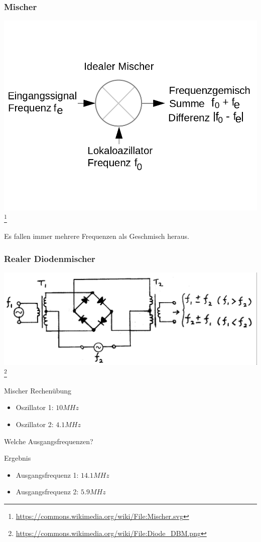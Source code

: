 \begin{frame}
    \frametitle{Mischer}
    \begin{center}
        \includegraphics[width=.8\textwidth,height=.75\textheight,keepaspectratio]{e15/IdealerMischer.png}
        \footnote{\tiny \url{https://commons.wikimedia.org/wiki/File:Mischer.svg}}
	\end{center}
    Es fallen immer mehrere Frequenzen als Geschmisch heraus.
\end{frame}

\begin{frame}
    \frametitle{Realer Diodenmischer}
    \begin{center}
        \includegraphics[width=.9\textwidth]{e15/Realer-Diodenmischer.png}
        \footnote{\tiny \url{https://commons.wikimedia.org/wiki/File:Diode_DBM.png}}
	\end{center}
\end{frame}

\begin{frame}
  \begin{exampleblock}{Mischer Rechenübung}
    \begin{itemize}
      \item Oszillator 1: $10 MHz$
      \item Oszillator 2: $4.1 MHz$
    \end{itemize}
    Welche Ausgangsfrequenzen?
  \end{exampleblock}
  \pause
  \begin{exampleblock}{Ergebnis}
    \begin{itemize}
      \item Ausgangsfrequenz 1: $14.1 MHz$
      \item Ausgangsfrequenz 2: $5.9 MHz$
    \end{itemize}
  \end{exampleblock}
\end{frame}

